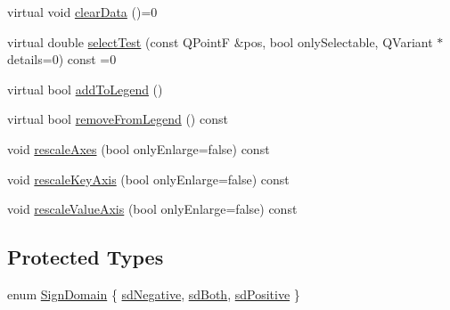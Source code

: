 \begin{DoxyCompactItemize}
\item 
virtual void \hyperlink{class_q_c_p_abstract_plottable_a86e5b8fd4b6ff4f4084e7ea4c573fc53}{clear\-Data} ()=0
\item 
virtual double \hyperlink{class_q_c_p_abstract_plottable_a38efe9641d972992a3d44204bc80ec1d}{select\-Test} (const Q\-Point\-F \&pos, bool only\-Selectable, Q\-Variant $\ast$details=0) const =0
\item 
virtual bool \hyperlink{class_q_c_p_abstract_plottable_a70f8cabfd808f7d5204b9f18c45c13f5}{add\-To\-Legend} ()
\item 
virtual bool \hyperlink{class_q_c_p_abstract_plottable_aa1f350e510326d012b9a9c9249736c83}{remove\-From\-Legend} () const 
\item 
void \hyperlink{class_q_c_p_abstract_plottable_a7e8fc3be43c27ccacd70a7bf9d74a5cd}{rescale\-Axes} (bool only\-Enlarge=false) const 
\item 
void \hyperlink{class_q_c_p_abstract_plottable_a1acecfcca3e7fcda00fcbaa3c886386f}{rescale\-Key\-Axis} (bool only\-Enlarge=false) const 
\item 
void \hyperlink{class_q_c_p_abstract_plottable_abfd0805eb1d955c0111a990246658324}{rescale\-Value\-Axis} (bool only\-Enlarge=false) const 
\end{DoxyCompactItemize}
\subsection*{Protected Types}
\begin{DoxyCompactItemize}
\item 
enum \hyperlink{class_q_c_p_abstract_plottable_a661743478a1d3c09d28ec2711d7653d8}{Sign\-Domain} \{ \hyperlink{class_q_c_p_abstract_plottable_a661743478a1d3c09d28ec2711d7653d8a0fc9a70796ef60ad18ddd18056e6dc63}{sd\-Negative}, 
\hyperlink{class_q_c_p_abstract_plottable_a661743478a1d3c09d28ec2711d7653d8a082b98cfb91a7363a3b5cd17b0c1cd60}{sd\-Both}, 
\hyperlink{class_q_c_p_abstract_plottable_a661743478a1d3c09d28ec2711d7653d8a02951859f243a4d24e779cfbb5471030}{sd\-Positive}
 \}
\end{DoxyCompactItemize}
